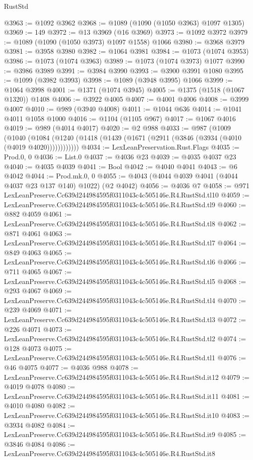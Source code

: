 \begin{lexlean}{RustStd}
\begin{coremodule}
@3963 := @1092 @3962
@3968 := @1089 (@1090 (@1050 @3963) @1097 @1305)
@3969 := 149
@3972 := @13 @3969 (@16 @3969)
@3973 := @1092 @3972
@3979 := @1089 (@1090 (@1050 @3973) @1097 @1558) @1066
@3980 := @3968 @3979
@3981 := @3958 @3980
@3982 := @1064 @3981
@3984 := @1073 (@1074 @3953)
@3986 := @1073 (@1074 @3963)
@3989 := @1073 (@1074 @3973) @1077
@3990 := @3986 @3989
@3991 := @3984 @3990
@3993 := @3900 @3991 @1080
@3995 := @1099 (@3982 @3993)
@3998 := @1089 (@3948 @3995) @1066
@3999 := @1064 @3998
@4001 := @1371 (@1074 @3945)
@4005 := @1375 (@1518 (@1067 @1320)) @1408
@4006 := @3922 @4005
@4007 := @4001 @4006
@4008 := @3999 @4007
@4010 := @989 (@3940 @4008)
@4011 := @1044 @636
@4014 := @1041 @4011 @1058 @1000
@4016 := @1104 (@1105 @967)
@4017 := @1067 @4016
@4019 := @989 (@4014 @4017)
@4020 := @2 @988
@4033 := @987
    (@1009
      (@1040 (@1084 (@1240 (@1418 (@1439 (@1671 (@2911 (@3846 (@3934 (@4010 (@4019 @4020))))))))))))
@4034 := LexLeanPreservation.Rust.Flags
@4035 := Prod.{0, 0}
@4036 := List.{0}
@4037 := @4036 @23
@4039 := @4035 @4037 @23
@4040 := @4035 @4039
@4041 := Bool
@4042 := @4040 @4041
@4043 := @6 @4042
@4044 := Prod.mk.{0, 0}
@4055 := @4043 (@4044 @4039 @4041 (@4044 @4037 @23 @137 @140) @1022) (@2 @4042)
@4056 := @4036 @7
@4058 := @971 LexLeanPreserve.Cc639d244984595f0311043c4c505146e.R4.RustStd.tl10
@4059 := LexLeanPreserve.Cc639d244984595f0311043c4c505146e.R4.RustStd.tl9
@4060 := @882 @4059
@4061 := LexLeanPreserve.Cc639d244984595f0311043c4c505146e.R4.RustStd.tl8
@4062 := @871 @4061
@4063 := LexLeanPreserve.Cc639d244984595f0311043c4c505146e.R4.RustStd.tl7
@4064 := @849 @4063
@4065 := LexLeanPreserve.Cc639d244984595f0311043c4c505146e.R4.RustStd.tl6
@4066 := @711 @4065
@4067 := LexLeanPreserve.Cc639d244984595f0311043c4c505146e.R4.RustStd.tl5
@4068 := @293 @4067
@4069 := LexLeanPreserve.Cc639d244984595f0311043c4c505146e.R4.RustStd.tl4
@4070 := @239 @4069
@4071 := LexLeanPreserve.Cc639d244984595f0311043c4c505146e.R4.RustStd.tl3
@4072 := @226 @4071
@4073 := LexLeanPreserve.Cc639d244984595f0311043c4c505146e.R4.RustStd.tl2
@4074 := @128 @4073
@4075 := LexLeanPreserve.Cc639d244984595f0311043c4c505146e.R4.RustStd.tl1
@4076 := @46 @4075
@4077 := @4036 @988
@4078 := LexLeanPreserve.Cc639d244984595f0311043c4c505146e.R4.RustStd.it12
@4079 := @4019 @4078
@4080 := LexLeanPreserve.Cc639d244984595f0311043c4c505146e.R4.RustStd.it11
@4081 := @4010 @4080
@4082 := LexLeanPreserve.Cc639d244984595f0311043c4c505146e.R4.RustStd.it10
@4083 := @3934 @4082
@4084 := LexLeanPreserve.Cc639d244984595f0311043c4c505146e.R4.RustStd.it9
@4085 := @3846 @4084
@4086 := LexLeanPreserve.Cc639d244984595f0311043c4c505146e.R4.RustStd.it8

\end{coremodule}
\end{lexlean}
